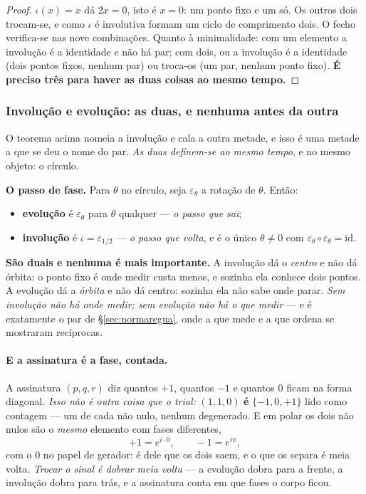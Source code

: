 \documentclass[livro.tex]{subfiles}
\begin{document}
\begin{proof}
$\iota(x)=x$ dá $2x=0$, isto é $x=0$: um ponto fixo e um só. Os outros dois trocam-se, e como
$\iota$ é involutiva formam um ciclo de comprimento dois. O fecho verifica-se nas nove
combinações. Quanto à minimalidade: com um elemento a involução é a identidade e não há par; com
dois, ou a involução é a identidade (dois pontos fixos, nenhum par) ou troca-os (um par, nenhum
ponto fixo). \textbf{É preciso três para haver as duas coisas ao mesmo tempo.}
\end{proof}

\subsubsection*{Involução e evolução: as duas, e nenhuma antes da outra}

O teorema acima nomeia a involução e cala a outra metade, e isso é uma metade a que se deu o
nome do par. \emph{As duas definem-se ao mesmo tempo}, e no mesmo objeto: o círculo.

\begin{mdframed}[linewidth=0.4pt,innerleftmargin=10pt,innerrightmargin=10pt,
                 innertopmargin=8pt,innerbottommargin=8pt,skipabove=6pt,skipbelow=6pt]
\textbf{O passo de fase.} Para $\theta$ no círculo, seja $\varepsilon_\theta$ a rotação de
$\theta$. Então:
\begin{itemize}\itemsep1pt
\item \textbf{evolução} é $\varepsilon_\theta$ para $\theta$ qualquer --- \emph{o passo que sai};
\item \textbf{involução} é $\iota=\varepsilon_{1/2}$ --- \emph{o passo que volta}, e é o único
      $\theta\neq 0$ com $\varepsilon_\theta\circ\varepsilon_\theta=\mathrm{id}$.
\end{itemize}
\end{mdframed}

\noindent \textbf{São duais e nenhuma é mais importante.} A involução dá o \emph{centro} e não dá
órbita: o ponto fixo é onde medir custa menos, e sozinha ela conhece dois pontos. A evolução dá a
\emph{órbita} e não dá centro: sozinha ela não sabe onde parar. \emph{Sem involução não há onde
medir; sem evolução não há o que medir} --- e é exatamente o par de \S\ref{sec:normaregua}, onde a
que mede e a que ordena se mostraram recíprocas.

\paragraph{E a assinatura é a fase, contada.} A assinatura $(p,q,r)$ diz quantos $+1$, quantos $-1$
e quantos $0$ ficam na forma diagonal. \emph{Isso não é outra coisa que o trial:} $(1,1,0)$ \textbf{é}
$\{-1,0,+1\}$ lido como contagem --- um de cada não nulo, nenhum degenerado. E em polar os dois não
nulos são o \emph{mesmo} elemento com fases diferentes,
\[
  +1 = e^{i\cdot 0}, \qquad -1 = e^{i\pi},
\]
com o $0$ no papel de gerador: é dele que os dois saem, e o que os separa é meia volta. \emph{Trocar
o sinal é dobrar meia volta} --- a evolução dobra para a frente, a involução dobra para trás, e a
assinatura conta em que fases o corpo ficou.
\end{document}

